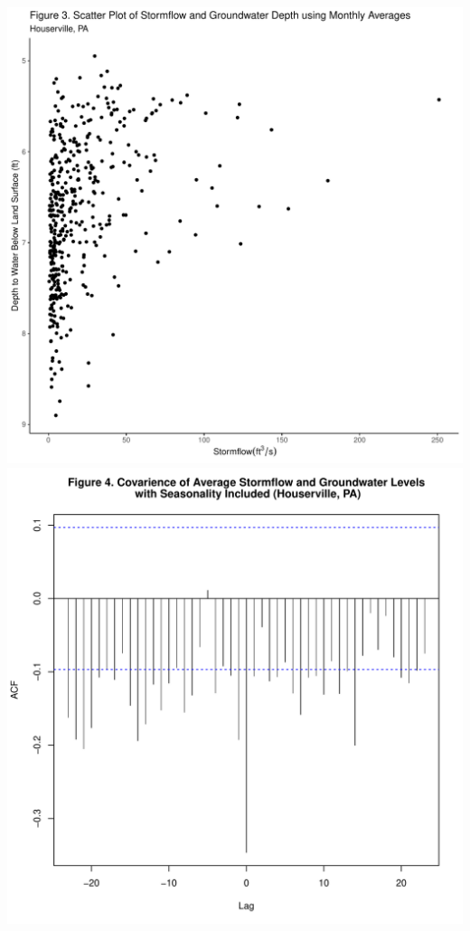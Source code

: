 \documentclass[
  12pt,
]{article}
\begin{document}
\includegraphics{Elliott_WDA_Project_files/figure-latex/groundwater_lag-1.pdf}
\includegraphics{Elliott_WDA_Project_files/figure-latex/groundwater_lag-2.pdf}
\end{document}
